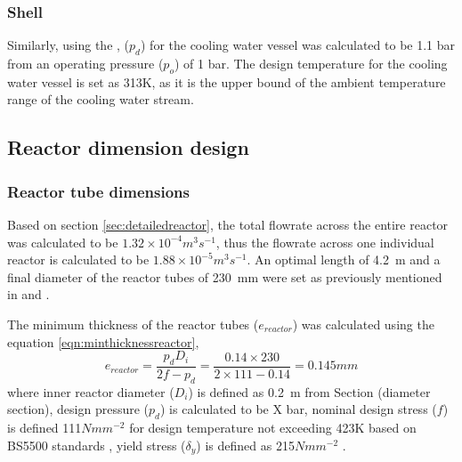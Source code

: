 \subsubsection{Shell}
Similarly, using the , ($p_d$) for the cooling water vessel was calculated to be 1.1 bar from an operating pressure ($p_o$) of 1 bar. The design temperature for the cooling water vessel is set as 313K, as it is the upper bound of the ambient temperature range of the cooling water stream. 

\subsection{Reactor dimension design}
\label{sec:reactordimensions}

\subsubsection{Reactor tube dimensions}
\label{sec:reactortube}
Based on section \ref{sec:detailedreactor}, the total flowrate across the entire reactor was calculated to be $1.32 \times 10^{-4} m^3s^{-1}$, thus the flowrate across one individual reactor is calculated to be  $1.88 \times 10^{-5} m^3s^{-1}$. An optimal length of \SI{4.2}{\metre} and a final diameter of the reactor tubes of \SI{230}{\milli \metre} were set as previously mentioned in  and . 

The minimum thickness of the reactor tubes ($e_{reactor}$) was calculated using the equation \ref{eqn:minthicknessreactor},
\begin{equation}
    e_{reactor} = \frac{p_dD_i}{2f-p_d} = \frac{0.14 \times 230}{2 \times 111 - 0.14} = 0.145mm
    \label{eqn:minthicknessreactor}
\end{equation}
where inner reactor diameter ($D_i$) is defined as \SI{0.2}{\metre} from Section (diameter section), design pressure ($p_d$) is calculated to be X bar, nominal design stress ($f$) is defined 111$Nmm^{-2}$ for design temperature not exceeding 423K based on BS5500 standards , yield stress ($\delta_y$) is defined as 215$Nmm^{-2}$ \cite{noauthor_unfired_nodate}.


